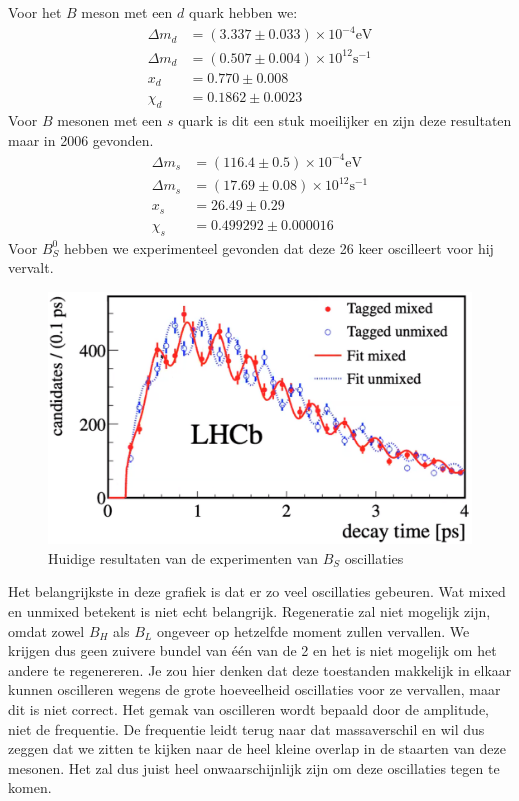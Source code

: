 \documentclass[../main.tex]{subfiles}
\begin{document}
Voor het $B$ meson met een $d$ quark hebben we:
\begin{equation}
    \begin{aligned}
        \label{eq:b_d_resultaten}
        \Delta m_{d} &=(3.337 \pm 0.033) \times 10^{-4} \text{eV} \\
        \Delta m_{d} &=(0.507 \pm 0.004) \times 10^{12} \text{s}^{-1}\\
        x_{d}&=0.770 \pm 0.008 \\
        \chi_{d}&=0.1862 \pm 0.0023
    \end{aligned}
\end{equation}
Voor $B$ mesonen met een $s$ quark is dit een stuk moeilijker en zijn deze resultaten maar in 2006 gevonden.
\begin{equation}
    \begin{aligned}
        \label{eq:b_s_resultaten}
        \Delta m_{s}&=(116.4 \pm 0.5) \times 10^{-4} \text{eV} \\
        \Delta m_{s}&=(17.69 \pm 0.08) \times 10^{12} \text{s}^{-1}\\
        x_{s}&=26.49 \pm 0.29 \\
        \chi_{s}&=0.499292 \pm 0.000016
    \end{aligned}
\end{equation}
Voor $B_S^0$ hebben we experimenteel gevonden dat deze 26 keer oscilleert voor hij vervalt.

\begin{figure}[h]
    \centering
    \includegraphics[width=0.5\linewidth]{meson_mixing_and_oscillations/b_s_osc_res.png}
    \caption{Huidige resultaten van de experimenten van $B_S$ oscillaties}%
    \label{fig:meson_mixing_and_oscillations/b_s_osc_res}
\end{figure}

Het belangrijkste in deze grafiek is dat er zo veel oscillaties gebeuren. Wat mixed en unmixed betekent is niet echt belangrijk. Regeneratie zal niet mogelijk zijn, omdat zowel $B_H$ als $B_L$ ongeveer op hetzelfde moment zullen vervallen. We krijgen dus geen zuivere bundel van één van de 2 en het is niet mogelijk om het andere te regenereren.  Je zou hier denken dat deze toestanden makkelijk in elkaar kunnen oscilleren wegens de grote hoeveelheid oscillaties voor ze vervallen, maar dit is niet correct. Het gemak van oscilleren wordt bepaald door de amplitude, niet de frequentie. De frequentie leidt terug naar dat massaverschil en wil dus zeggen dat we zitten te kijken naar de heel kleine overlap in de staarten van deze mesonen. Het zal dus juist heel onwaarschijnlijk zijn om deze oscillaties tegen te komen.
\end{document}
